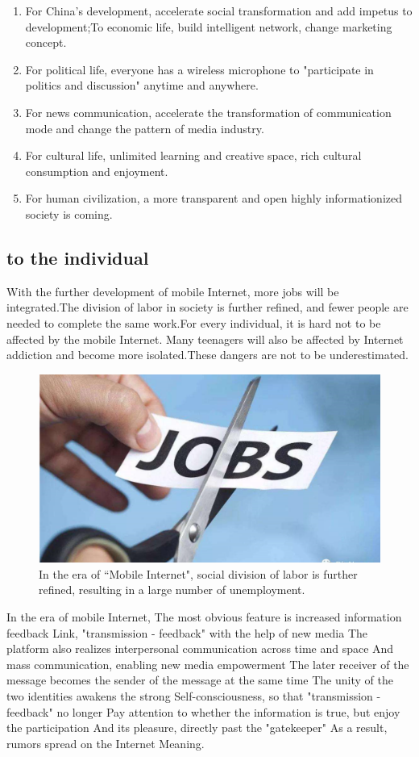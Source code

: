 \documentclass{elsarticle}
\begin{document}
\begin{enumerate}
	\item For China's development, accelerate social transformation and add impetus to development;To economic life, build intelligent network, change marketing concept.
	\item For political life, everyone has a wireless microphone to "participate in politics and discussion" anytime and anywhere.
	\item For news communication, accelerate the transformation of communication mode and change the pattern of media industry.
	\item For cultural life, unlimited learning and creative space, rich cultural consumption and enjoyment.
	\item For human civilization, a more transparent and open highly informationized society is coming.

\end{enumerate}


\subsection{to the individual}
With the further development of mobile Internet, more jobs will be integrated.The division of labor in society is further refined, and fewer people are needed to complete the same work.For every individual, it is hard not to be affected by the mobile Internet. Many teenagers will also be affected by Internet addiction and become more isolated.These dangers are not to be underestimated.

\begin{figure}[ht!]
	\centering
	\includegraphics[trim=0in 3in 0in 0in,clip,width=0.75\columnwidth]{caiyuan.png}
	\caption{In the era of ``Mobile Internet", social division of labor is further refined, resulting in a large number of unemployment.\label{fig:caiyuan}}
\end{figure}


In the era of mobile Internet,
The most obvious feature is increased information feedback
Link, "transmission - feedback" with the help of new media
The platform also realizes interpersonal communication across time and space
And mass communication, enabling new media empowerment
The later receiver of the message becomes the sender of the message at the same time\cite{zw10}
The unity of the two identities awakens the strong
Self-consciousness, so that "transmission - feedback" no longer
Pay attention to whether the information is true, but enjoy the participation
And its pleasure, directly past the "gatekeeper"
As a result, rumors spread on the Internet
Meaning.
\end{document}
